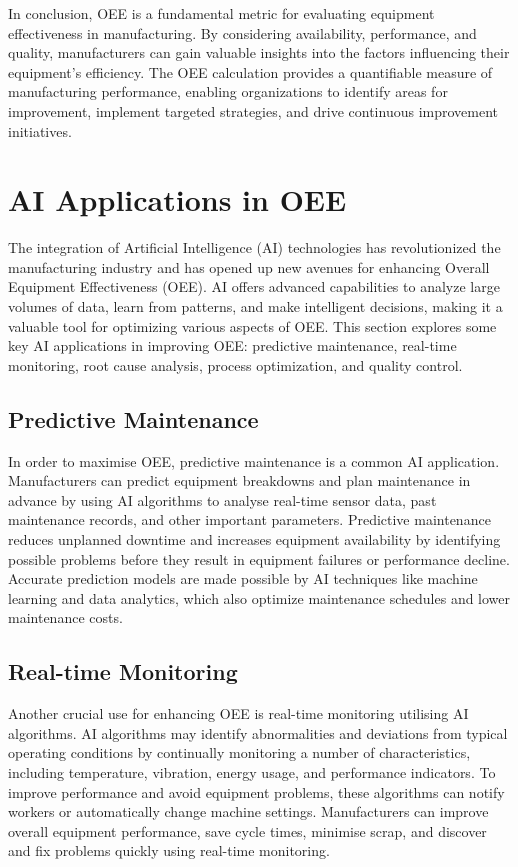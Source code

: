 \documentclass[12pt]{article}
\begin{document}
In conclusion, OEE is a fundamental metric for evaluating equipment effectiveness in manufacturing. By considering availability, performance, and quality, manufacturers can gain valuable insights into the factors influencing their equipment's efficiency. The OEE calculation provides a quantifiable measure of manufacturing performance, enabling organizations to identify areas for improvement, implement targeted strategies, and drive continuous improvement initiatives.

\section{AI Applications in OEE}
The integration of Artificial Intelligence (AI) technologies has revolutionized the manufacturing industry and has opened up new avenues for enhancing Overall Equipment Effectiveness (OEE). AI offers advanced capabilities to analyze large volumes of data, learn from patterns, and make intelligent decisions, making it a valuable tool for optimizing various aspects of OEE. This section explores some key AI applications in improving OEE: predictive maintenance, real-time monitoring, root cause analysis, process optimization, and quality control.

\subsection{Predictive Maintenance}
In order to maximise OEE, predictive maintenance is a common AI application. Manufacturers can predict equipment breakdowns and plan maintenance in advance by using AI algorithms to analyse real-time sensor data, past maintenance records, and other important parameters. Predictive maintenance reduces unplanned downtime and increases equipment availability by identifying possible problems before they result in equipment failures or performance decline. Accurate prediction models are made possible by AI techniques like machine learning and data analytics, which also optimize maintenance schedules and lower maintenance costs.

\subsection{Real-time Monitoring}
Another crucial use for enhancing OEE is real-time monitoring utilising AI algorithms. AI algorithms may identify abnormalities and deviations from typical operating conditions by continually monitoring a number of characteristics, including temperature, vibration, energy usage, and performance indicators. To improve performance and avoid equipment problems, these algorithms can notify workers or automatically change machine settings. Manufacturers can improve overall equipment performance, save cycle times, minimise scrap, and discover and fix problems quickly using real-time monitoring.
\end{document}
